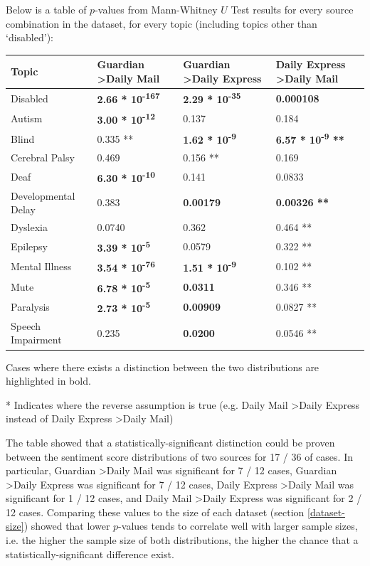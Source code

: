 \documentclass{report}
\begin{document}
Below is a table of $p$-values from Mann-Whitney $U$ Test results for every source combination in the dataset, for every topic (including topics other than `disabled'):

\noindent
\begin{tabu} to \textwidth { | X[c] | X[c] | X[c] | X[c] | }
	\hline
	Topic & Guardian \textgreater\space Daily Mail & Guardian \textgreater\space Daily Express & Daily Express \textgreater\space Daily Mail  \\
		\hline
	Disabled & \textbf{2.66 * 10\textsuperscript{-167}} & \textbf{2.29 * 10\textsuperscript{-35}} & \textbf{0.000108}  \\
	\hline
	Autism & \textbf{3.00 * 10\textsuperscript{-12}} & 0.137 & 0.184  \\
	\hline
	Blind & 0.335 ** & \textbf{1.62 * 10\textsuperscript{-9}} & \textbf{6.57 * 10\textsuperscript{-9} **} \\
	\hline
	Cerebral Palsy & 0.469 & 0.156 ** & 0.169  \\
	\hline
	Deaf & \textbf{6.30 * 10\textsuperscript{-10}} & 0.141 & 0.0833  \\
	\hline
	Developmental Delay & 0.383 & \textbf{0.00179} & \textbf{0.00326 **}  \\
	\hline
	Dyslexia & 0.0740 & 0.362 & 0.464 **  \\
	\hline
	Epilepsy & \textbf{3.39 * 10\textsuperscript{-5}} & 0.0579 & 0.322 **  \\
	\hline
	Mental Illness & \textbf{3.54 * 10\textsuperscript{-76}} & \textbf{1.51 * 10\textsuperscript{-9}} & 0.102 **  \\
	\hline
	Mute & \textbf{6.78 * 10\textsuperscript{-5}} & \textbf{0.0311} & 0.346 ** \\
	\hline
	Paralysis & \textbf{2.73 * 10\textsuperscript{-5}} & \textbf{0.00909} & 0.0827 **  \\
	\hline
	Speech Impairment & 0.235 & \textbf{0.0200} & 0.0546 **  \\
	\hline
\end{tabu}
Cases where there exists a distinction between the two distributions are highlighted in bold.

\noindent ** Indicates where the reverse assumption is true (e.g. Daily Mail \textgreater\space Daily Express instead of Daily Express \textgreater\space Daily Mail)

The table showed that a statistically-significant distinction could be proven between the sentiment score distributions of two sources for 17 / 36 of cases.
In particular, Guardian \textgreater\space Daily Mail was significant for 7 / 12 cases, Guardian \textgreater\space Daily Express was significant for 7 / 12 cases, Daily Express \textgreater\space Daily Mail was significant for 1 / 12 cases, and Daily Mail \textgreater\space Daily Express was significant for 2 / 12 cases.
Comparing these values to the size of each dataset (section \ref{dataset-size}) showed that lower $p$-values tends to correlate well with larger sample sizes, i.e. the higher the sample size of both distributions, the higher the chance that a statistically-significant difference exist.
\end{document}

